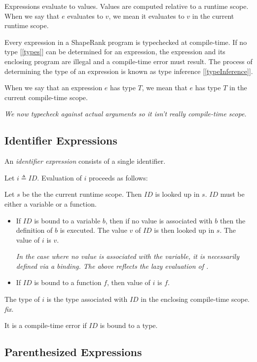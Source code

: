 \documentclass{article}
\begin{document}
Expressions evaluate to values. Values are computed relative to a runtime scope. When we say that $e$ evaluates to $v$, we mean it evaluates to $v$ in the current runtime scope.

\Expression{} 

Every expression in a ShapeRank program is typechecked at compile-time. If no type [\ref{types}] can be determined for an expression, the expression and its enclosing program are illegal and a compile-time error must result. The process of determining the type of an expression is known as type inference [\ref{typeInference}]. 

 When we say that an expression $e$ has type $T$, we mean that $e$ has type $T$ in the current compile-time scope.

{\em We now typecheck against actual arguments so it isn't really compile-time scope.}

\subsection{Identifier Expressions}
\label{identifierExpressions}

An {\em identifier expression} consists of a single identifier.

\IdentifierExpression{}

Let $i \triangleq ID$.
Evaluation of $i$ proceeds as follows:


Let $s$ be the the current runtime scope. Then $ID$ is looked up in $s$. $ID$ must be either a variable or a function.
\begin{itemize}
\item If $ID$ is bound to a variable $b$, then if no value is associated with $b$ then the definition of $b$ is executed. The value $v$ of $ID$ is then looked up in $s$. The value of $i$ is $v$.

{\em In the case where no value is associated with the variable, it is necessarily defined via  a \LET{} binding. The above reflects the lazy evaluation of \LET{}.}

\item If $ID$ is bound to a function $f$, then value of $i$ is $f$. 
\end{itemize}

The type of $i$ is the type associated with $ID$ in the enclosing compile-time scope. {\em fix}.

It is a compile-time error if $ID$ is bound to a type. 


\subsection{Parenthesized Expressions}
\label{parenthesizedExpressions}
\end{document}

